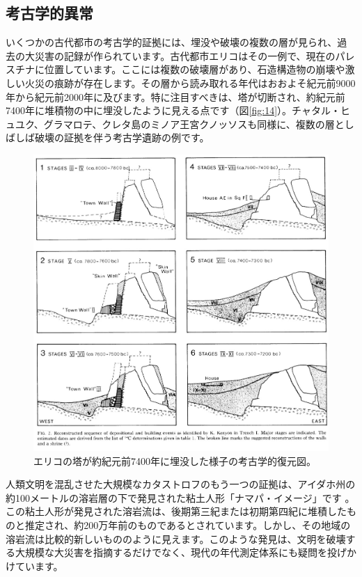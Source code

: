\documentclass[10pt,twocolumn,letterpaper]{article}
\begin{document}
\subsection{考古学的異常}

いくつかの古代都市の考古学的証拠には、埋没や破壊の複数の層が見られ、過去の大災害の記録が作られています。古代都市エリコはその一例で、現在のパレスチナに位置しています。ここには複数の破壊層があり、石造構造物の崩壊や激しい火災の痕跡が存在します\cite{96,97}。その層から読み取れる年代はおおよそ紀元前9000年から紀元前2000年に及びます。特に注目すべきは、塔が切断され、約紀元前7400年に堆積物の中に埋没したように見える点です（図\ref{fig:14}）\cite{95}。チャタル・ヒュユク\cite{99}、グラマロテ\cite{98}、クレタ島のミノア王宮クノッソス\cite{100,101}も同様に、複数の層としばしば破壊の証拠を伴う考古学遺跡の例です。

\begin{figure}[t]
\begin{center}
   \includegraphics[width=1\linewidth]{jericho.jpg}
\end{center}
   \caption{エリコの塔が約紀元前7400年に埋没した様子の考古学的復元図\cite{95}。}
\label{fig:14}
\label{fig:onecol}
\end{figure}
人類文明を混乱させた大規模なカタストロフのもう一つの証拠は、アイダホ州の約100メートルの溶岩層の下で発見された粘土人形「ナマパ・イメージ」です \cite{102,103}。 この粘土人形が発見された溶岩流は、後期第三紀または初期第四紀に堆積したものと推定され、約200万年前のものであるとされています。しかし、その地域の溶岩流は比較的新しいもののように見えます。このような発見は、文明を破壊する大規模な大災害を指摘するだけでなく、現代の年代測定体系にも疑問を投げかけています。
\end{document}
